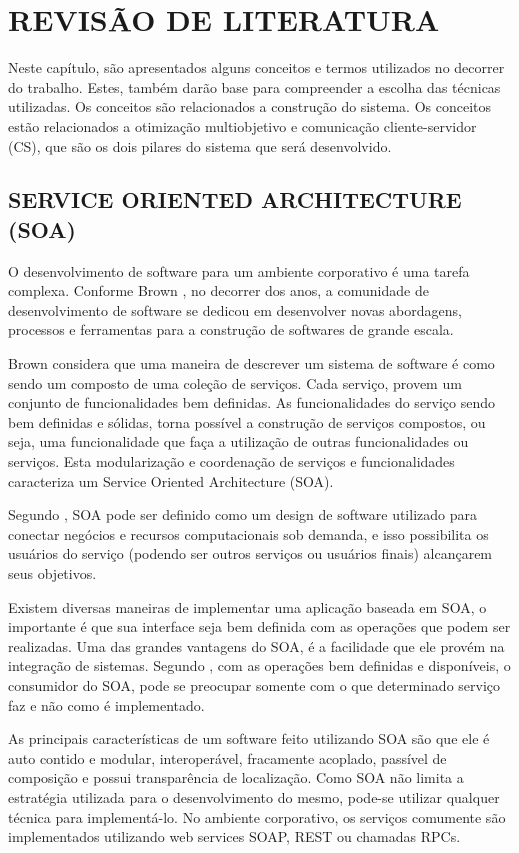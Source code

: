 \chapter{REVISÃO DE LITERATURA}
\label{chap:fundamentacaoTeorica}

Neste capítulo, são apresentados alguns conceitos e termos utilizados no decorrer do trabalho. 
Estes, também darão base para compreender a escolha das técnicas utilizadas. 
Os conceitos são relacionados a construção do sistema. 
Os conceitos estão relacionados a otimização multiobjetivo e comunicação cliente-servidor (CS), 
que são os dois pilares do sistema que será desenvolvido.

\section{SERVICE ORIENTED ARCHITECTURE (SOA)}
O desenvolvimento de software para um ambiente corporativo é uma tarefa complexa. 
Conforme Brown \cite{brown}, no decorrer dos anos, a comunidade de desenvolvimento de software se 
dedicou em desenvolver novas abordagens, processos e ferramentas para a construção de softwares de 
grande escala. 

Brown considera que uma maneira de descrever um sistema de software é como sendo um composto de 
uma coleção de serviços. Cada serviço, provem um conjunto de funcionalidades bem definidas. 
As funcionalidades do serviço sendo bem definidas e sólidas, torna possível a construção de serviços 
compostos, ou seja, uma funcionalidade que faça a utilização de outras funcionalidades ou serviços. 
Esta modularização e coordenação de serviços e funcionalidades caracteriza um 
Service Oriented Architecture (SOA).

Segundo \cite{valipour}, SOA pode ser definido como um design de software utilizado para 
conectar negócios e recursos computacionais sob demanda, e isso possibilita os usuários 
do serviço (podendo ser outros serviços ou usuários finais) alcançarem seus objetivos. 

Existem diversas maneiras de implementar uma aplicação baseada em SOA, o importante é que 
sua interface seja bem definida com as operações que podem ser realizadas. 
Uma das grandes vantagens do SOA, é a facilidade que ele provém na integração de sistemas. 
Segundo \cite{valipour}, com as operações bem definidas e disponíveis, o consumidor do SOA, 
pode se preocupar somente com o que determinado serviço faz e não como é implementado.

As principais características de um software feito utilizando SOA são que ele é auto contido e 
modular, interoperável, fracamente acoplado, passível de composição e possui transparência de localização. 
Como SOA não limita a estratégia utilizada para o desenvolvimento do mesmo, pode-se utilizar qualquer 
técnica para implementá-lo. No ambiente corporativo, os serviços comumente são implementados 
utilizando web services SOAP, REST ou chamadas RPCs.

